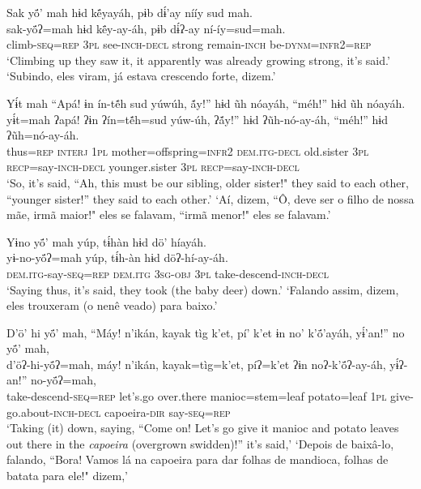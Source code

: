 \documentclass[output=paper,
modfonts,nonflat
]{langsci/langscibook}
\begin{document}
\ea  Sak yö́’ mah hɨd kë́yayáh, pɨb dɨ́’ay nííy sud mah.\\
\gll sak-yö́ʔ=mah hɨd kë́y-ay-áh, pɨb dɨ́ʔ-ay ní-íy=sud=mah.\\
     climb\textsc{-seq=rep} \textsc{3pl} see\textsc{-inch-decl} strong remain\textsc{-inch} be\textsc{-dynm=infr2=rep}\\
\glt ‘Climbing up they saw it, it apparently was already growing strong, it's said.'
\glt ‘Subindo, eles viram, já estava crescendo forte, dizem.'
\z 

\newpage
\ea  Yɨ́t mah “Apá! ɨn ín-tẽ́h sud yúwúh, ã́y!” hɨd ũh nóayáh, “méh!” hɨd ũh nóayáh.\\
\gll yɨ́t=mah ʔapá! ʔɨn ʔín=tẽ́h=sud yúw-úh, ʔã́y!” hɨd ʔũh-nó-ay-áh, “méh!” hɨd ʔũh=nó-ay-áh.\\
     thus\textsc{=rep} \textsc{interj} \textsc{1pl} mother=offspring\textsc{=infr2} \textsc{dem.itg-decl} old.sister \textsc{3pl} \textsc{recp=}say\textsc{-inch-decl} younger.sister \textsc{3pl} \textsc{recp=}say\textsc{-inch-decl}\\
\glt ‘So, it’s said, “Ah, this must be our sibling, older sister!" they said to each other, “younger sister!” they said to each other.'{\footnotemark}
\glt ‘Aí, dizem, “Ô, deve ser o filho de nossa mãe, irmã maior!" eles se falavam, “irmã menor!" eles se falavam.'
\z 

\ea  Yɨno yö́’ mah yúp, tɨ́hàn hɨd dö’ híayáh.\\
\gll yɨ-no-yö́ʔ=mah yúp, tɨ́h-àn hɨd döʔ-hí-ay-áh.\\
     \textsc{dem.itg-}say\textsc{-seq=rep} \textsc{dem.itg} \textsc{3sg-obj} \textsc{3pl} take-descend\textsc{-inch-decl}\\
\glt ‘Saying thus, it’s said, they took (the baby deer) down.'
\glt ‘Falando assim, dizem, eles trouxeram (o nenê veado) para baixo.'
\z 

\ea  D’ö’ hi yö́’ mah, “Máy! n’ikán, kayak tìg k’et, pí’ k’et ɨn no’ k’ö́’ayáh, yɨ́’an!” no yö́’ mah,\\
\gll d’öʔ-hi-yö́ʔ=mah, máy! n’ikán, kayak=tìg=k’et, píʔ=k’et ʔɨn noʔ-k’ö́ʔ-ay-áh, yɨ́ʔ-an!” no-yö́ʔ=mah,\\
     take-descend\textsc{-seq=rep} let’s.go over.there manioc=stem=leaf potato=leaf \textsc{1pl} give-go.about\textsc{-inch-decl} capoeira\textsc{-dir} say\textsc{-seq=rep}\\
\glt ‘Taking (it) down, saying, “Come on! Let's go give it manioc and potato leaves out there in the \textit{capoeira} (overgrown swidden)!” it’s said,'
\glt ‘Depois de baixâ-lo, falando, “Bora! Vamos lá na capoeira para dar folhas de mandioca, folhas de batata para ele!" dizem,'
\z 
\end{document}
